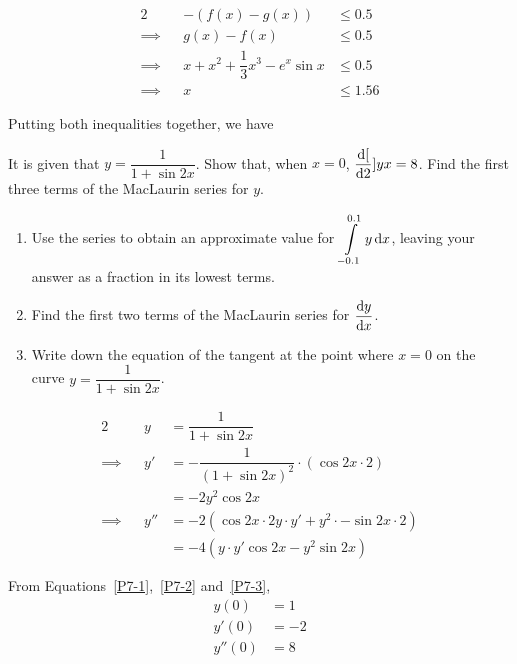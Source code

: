 \documentclass{echw}
\begin{document}
            \begin{alignat*}{2}
                &&-\left(f(x) - g(x)\right) &\leq 0.5\\
                \implies&&g(x) - f(x) &\leq 0.5\\
                \implies&&x + x^2 + \dfrac13 x^3 - e^x \sin x &\leq 0.5\\
                \implies&&x &\leq 1.56
            \end{alignat*}

            Putting both inequalities together, we have


    \problem{}
        It is given that $y = \dfrac1{1 + \sin 2x}$. Show that, when $x = 0$, $\dfrac{\mathrm{d} [}{\mathrm{d} 2}]{y}{x} = 8$. Find the first three terms of the MacLaurin series for $y$.

        \begin{enumerate}
            \item Use the series to obtain an approximate value for $\displaystyle\int\limits_{-0.1}^{0.1} y \mathop{\mathrm{d}x}$, leaving your answer as a fraction in its lowest terms.
            \item Find the first two terms of the MacLaurin series for $\dfrac{\mathrm{d} y}{\mathrm{d} x}$.
            \item Write down the equation of the tangent at the point where $x = 0$ on the curve $y = \dfrac1{1 + \sin 2x}$.
        \end{enumerate}

    \solution
        \begin{alignat}{2}
            && y &= \dfrac1{1 + \sin 2x} \label{P7-1} \\
            \implies&&y' &= -\dfrac1{(1+\sin 2x)^2} \cdot (\cos 2x \cdot 2)\nonumber\\
            && &= -2 y^2\cos 2x \label{P7-2}\\
            \implies&&y'' &= -2 \left(\cos 2x \cdot 2y\cdot y' + y^2 \cdot -\sin 2x \cdot 2\right)\nonumber\\
            && &= -4\left(y\cdot y' \cos 2x - y^2\sin 2x  \right)\label{P7-3}
        \end{alignat}
        
        From Equations~\ref{P7-1},~\ref{P7-2} and~\ref{P7-3},
        \begin{align*}
            y(0) &= 1\\
            y'(0) &= -2\\
            y''(0) &= 8
        \end{align*}
\end{document}
